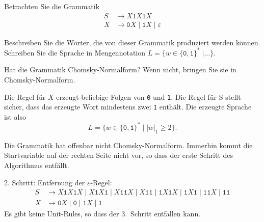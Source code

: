 Betrachten Sie die Grammatik
\begin{align*}
S & \to X \texttt{1} X \texttt{1} X \\
X & \to \texttt{0} X  \;|\; \texttt{1} X \;|\; \varepsilon
\end{align*}
\begin{teilaufgaben}
\item
Beschreiben Sie die Wörter, die von dieser Grammatik produziert werden können.
Schreiben Sie die Sprache in Mengennotation
$L=\{w\in\{\texttt{0},\texttt{1}\}^*\;|\dots\}$.
\item
Hat die Grammatik Chomsky-Normalform?
Wenn nicht, bringen Sie sie in Chomsky-Normalform.
\end{teilaufgaben}


\begin{loesung}
\begin{teilaufgaben}
\item
Die Regel für $X$ erzeugt beliebige Folgen von \texttt{0} und \texttt{1}.
Die Regel für S stellt sicher, dass das erzeugte Wort mindestens zwei
\texttt{1} enthält.
Die erzeugte Sprache ist also
\[
L=\{
w\in\{\texttt{0},\texttt{1}\}^*
\;|\;
|w|_{\texttt{1}} \ge 2\}.
\]
\item
Die Grammatik hat offenbar nicht Chomsky-Normalform.
Immerhin kommt die Startvariable auf der rechten Seite nicht vor,
so dass der erste Schritt des Algorithmus entfällt.

2. Schritt: Entfernung der $\varepsilon$-Regel:
\begin{align*}
S & \to
X \texttt{1} X \texttt{1} X
\;|\;
X \texttt{1} X \texttt{1} 
\;|\;
X \texttt{1}   \texttt{1} X
\;|\;
X \texttt{1}   \texttt{1} 
\;|\;
  \texttt{1} X \texttt{1} X
\;|\;
  \texttt{1} X \texttt{1}  
\;|\;
  \texttt{1}   \texttt{1} X
\;|\;
  \texttt{1}   \texttt{1}  
\\
X & \to
\texttt{0} X
\;|\;
\texttt{0}
\;|\;
\texttt{1} X
\;|\;
\texttt{1}
\end{align*}
Es gibt keine Unit-Rules, so dass der 3.~Schritt entfallen kann.


\end{teilaufgaben}
\end{loesung}
